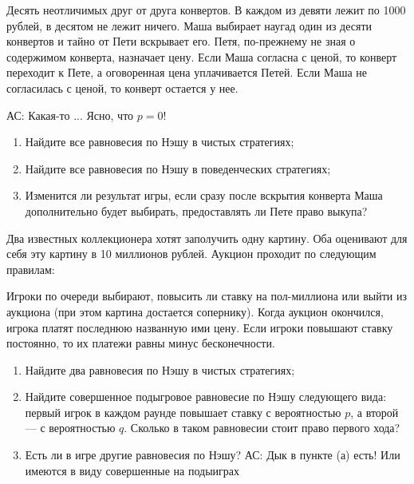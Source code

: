 \begin{problem}
Десять неотличимых друг от друга конвертов. В каждом из девяти лежит по 1000 рублей, в десятом не лежит ничего. Маша выбирает наугад один из десяти конвертов и тайно от Пети вскрывает его. Петя, по-прежнему не зная о содержимом конверта, назначает цену. Если Маша согласна с ценой, то конверт переходит к Пете, а оговоренная цена уплачивается Петей. Если Маша не согласилась с ценой, то конверт остается у нее.\par

{\red АС: Какая-то ... Ясно, что $p=0$!}

\begin{enumerate}
\item Найдите все равновесия по Нэшу в чистых стратегиях;\par
\item Найдите все равновесия по Нэшу в {\red поведенческих} стратегиях;\par
\item  Изменится ли результат игры, если сразу после вскрытия конверта Маша дополнительно будет выбирать, предоставлять ли Пете право выкупа?
\end{enumerate}


\begin{sol}

\end{sol}
\end{problem}



\begin{problem}\par
\begin{source} \cite{cramton:lectures}\end{source}
Два известных коллекционера хотят заполучить одну картину. Оба оценивают для себя эту картину в 10 миллионов рублей. Аукцион проходит по следующим правилам:\par
Игроки по очереди выбирают, повысить ли ставку на пол-миллиона или выйти из аукциона (при этом картина достается сопернику). Когда аукцион окончился,  игрока платят последнюю названную ими цену. Если игроки повышают ставку постоянно, то их платежи равны минус бесконечности.
\begin{enumerate}
\item Найдите два равновесия по Нэшу в чистых стратегиях;\par
\item Найдите совершенное подыгровое равновесие по Нэшу следующего вида: первый игрок в каждом раунде повышает ставку с вероятностью  $p$, а второй — с вероятностью  $q$. Сколько в таком равновесии стоит право первого хода?\par
\item  Есть ли в игре другие равновесия по Нэшу? {\red АС: Дык в пункте (а) есть! Или имеются в виду совершенные на подыиграх}
\end{enumerate}

\begin{sol}

\end{sol}
\end{problem}




